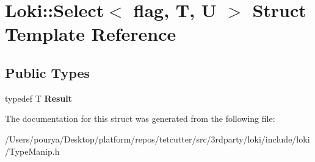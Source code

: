 \hypertarget{structLoki_1_1Select}{}\section{Loki\+:\+:Select$<$ flag, T, U $>$ Struct Template Reference}
\label{structLoki_1_1Select}
\subsection*{Public Types}
\begin{DoxyCompactItemize}
\item 
\hypertarget{structLoki_1_1Select_ace0706309a81d4cca07350ef85c31ce2}{}typedef T {\bfseries Result}\label{structLoki_1_1Select_ace0706309a81d4cca07350ef85c31ce2}

\end{DoxyCompactItemize}


The documentation for this struct was generated from the following file\+:\begin{DoxyCompactItemize}
\item 
/\+Users/pourya/\+Desktop/platform/repos/tetcutter/src/3rdparty/loki/include/loki/Type\+Manip.\+h\end{DoxyCompactItemize}
